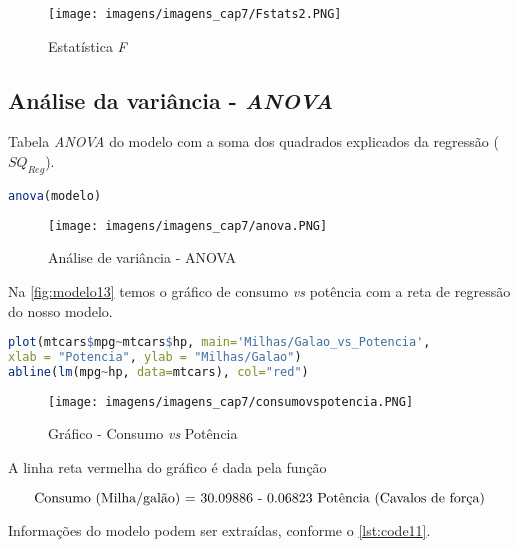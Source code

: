 \begin{figure}[H]
\centering
\caption{Estatística \textit{F}}
\texttt{[image: imagens/imagens\_cap7/Fstats2.PNG]}
\label{fig:modelo11}
\end{figure}

\subsection{Análise da variância - \textit{ANOVA}}

\noindent Tabela \textit{ANOVA} do modelo com a soma dos quadrados explicados da regressão ($SQ_{Reg}$).

\begin{lstlisting}[language=R, caption = {ANOVA},label={lst:code9}]
anova(modelo)
\end{lstlisting}

\begin{figure}[H]
\centering
\caption{Análise de variância - ANOVA}
\texttt{[image: imagens/imagens\_cap7/anova.PNG]}
\label{fig:modelo12}
\end{figure}

\newpage

\noindent Na \autoref{fig:modelo13} temos o gráfico de consumo \textit{vs} potência com a reta de regressão do nosso modelo.

\begin{lstlisting}[language=R, caption = {Consumo \textit{vs} Potência},label={lst:code10}]
plot(mtcars$mpg~mtcars$hp, main='Milhas/Galao_vs_Potencia',
xlab = "Potencia", ylab = "Milhas/Galao")
abline(lm(mpg~hp, data=mtcars), col="red")
\end{lstlisting}

\begin{figure}[H]
\label{fig:consumovspotencia}
\caption{Gráfico - Consumo \textit{vs} Potência}
\texttt{[image: imagens/imagens\_cap7/consumovspotencia.PNG]}
\label{fig:modelo13}
\end{figure}

\noindent A linha reta vermelha do gráfico é dada pela função

\begin{equation}
\label{eq:eq71}
    \text{Consumo (Milha/galão) = 30.09886 - 0.06823 \text{Potência (Cavalos de força)}}
\end{equation}

\newpage

\noindent Informações do modelo podem ser extraídas, conforme o \autoref{lst:code11}.

